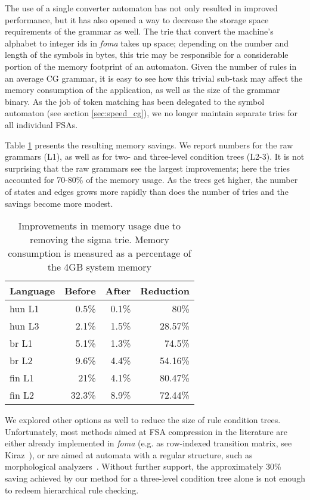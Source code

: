 \documentclass[11pt]{article}
\begin{document}
The use of a single converter automaton has not only resulted in improved
performance, but it has also opened a way to decrease the storage space
requirements of the grammar as well. The trie that convert the 
machine's alphabet to integer ids in \emph{foma} takes up space; depending on
the number and length of the symbols in bytes, this trie may be responsible for
a considerable portion of the memory
footprint of an automaton. Given the number of rules in an average CG grammar,
it is easy to see how this trivial sub-task may affect the memory consumption of
the application, as well as the size of the grammar binary.
As the job of token matching has been delegated to the symbol
automaton (see section \ref{sec:speed_cg}), we no longer maintain
separate tries for all individual FSAs. 

Table \ref{tab:sigma_memory} presents the resulting memory savings.
We report numbers for the raw grammars (L1), as well as for two- and three-level
condition trees (L2-3). It is not surprising that the raw grammars see the
largest improvements; here the tries accounted for 70-80\% of the memory
usage. As the trees get higher, the number of states and edges grows more
rapidly than does the number of tries and the savings become more modest.

\begin{table}[h]
  \centering
  \caption{Improvements in memory usage due to removing the sigma trie. Memory
           consumption is measured as a percentage of the 4GB system memory}
  \label{tab:sigma_memory}
  \begin{tabular}{ | l | r | r | r | }
  \hline
  \textbf{Language} & \textbf{Before} & \textbf{After} & \textbf{Reduction} \\
  \hline
  hun L1 & 0.5\% & 0.1\% & 80\% \\
  hun L3 & 2.1\% & 1.5\% & 28.57\% \\
  br L1 & 5.1\% & 1.3\% & 74.5\% \\
  br L2 & 9.6\% & 4.4\% & 54.16\% \\
  fin L1 & 21\% & 4.1\% & 80.47\% \\
  fin L2 & 32.3\% & 8.9\% & 72.44\% \\
  \hline
  \end{tabular}
\end{table}

We explored other options as well to reduce the size of rule condition trees.
Unfortunately, most methods aimed at FSA compression in the literature are
either already implemented in \emph{foma} (e.g. as row-indexed transition matrix,
see Kiraz~), or are aimed at automata with a regular structure,
such as morphological analyzers~\cite{Huet:2003,Huet:2005,Drobac:2014}. Without
further support, the approximately 30\% saving achieved by our method for a
three-level condition tree alone is not enough to redeem hierarchical rule
checking.
\end{document}
